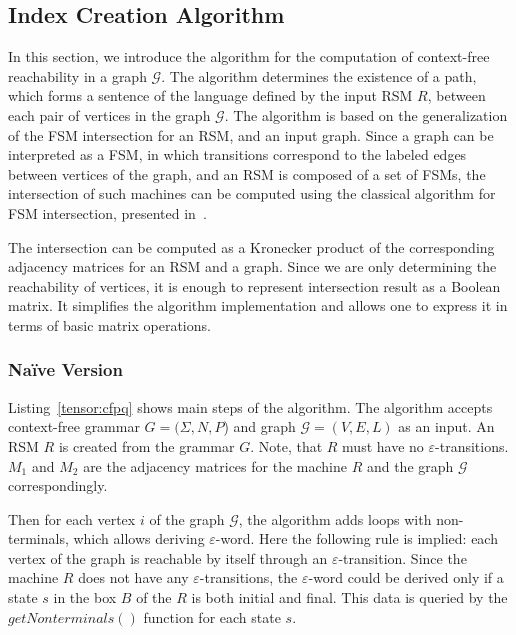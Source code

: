 \subsection{Index Creation Algorithm}

In this section, we introduce the algorithm for the computation of 
context-free reachability in a graph $\mathcal{G}$. The algorithm determines 
the existence of a path, which forms a sentence of the language defined by 
the input RSM $R$, between each pair of vertices in the graph $\mathcal{G}$.
The algorithm is based on the generalization of the FSM intersection for an RSM, 
and an input graph. Since a graph can be interpreted as a FSM, in which 
transitions correspond to the labeled edges between vertices of the graph, 
and an RSM is composed of a set of FSMs, the intersection of such machines
can be computed using the classical algorithm for FSM intersection, presented 
in~\cite{automata:theory:10.5555/1177300}.

The intersection can be computed as a Kronecker product of the corresponding 
adjacency matrices for an RSM and a graph. Since we are only determining the
reachability of vertices, it is enough to represent intersection result as 
a Boolean matrix. It simplifies the algorithm implementation and allows 
one to express it in terms of basic matrix operations.

\subsubsection{Na{\"i}ve Version}
Listing~\ref{tensor:cfpq} shows main steps of the algorithm.
The algorithm accepts context-free grammar $G=(\Sigma,N,P$) and graph $\mathcal{G}=(V,E,L)$ as an input.
An RSM $R$ is created from the grammar $G$.
Note, that $R$ must have no $\varepsilon$-transitions.
$M_1$ and $M_2$ are the adjacency matrices for the machine $R$ and the graph $\mathcal{G}$ correspondingly.

Then for each vertex $i$ of the graph $\mathcal{G}$, the algorithm adds loops 
with non-terminals, which allows deriving $\varepsilon$-word.
Here the following rule is implied: each vertex of the graph is reachable 
by itself through an $\varepsilon$-transition. Since the machine $R$ does 
not have any $\varepsilon$-transitions, the $\varepsilon$-word could be 
derived only if a state $s$ in the box $B$ of the $R$ is both initial and final.
This data is queried by the $getNonterminals()$ function for each state $s$.

